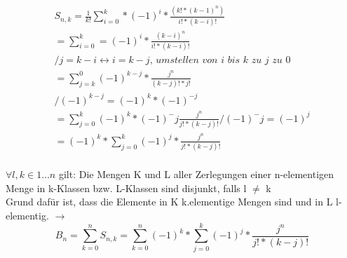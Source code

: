 \documentclass[]{article}
\title{}
\author{}
\date{}
\begin{document}
\maketitle





\begin{gather*}
 S_{n,k} = \frac{1}{k!} \sum_{i=0}^{k}*(-1)^i * \frac{(k!*(k-1)^n)}{i!*(k-i)!}\\
 = \sum_{i=0}^{k} = (-1)^i*\frac{(k-i)^n}{i!*(k-i)!}\\ / j = k-i \longleftrightarrow i=k-j \textit {, umstellen von i bis k zu j zu 0}\\
 =\sum_{j = k}^{0}(-1)^{k-j} * \frac{j^n}{(k-j)!*j!} \\ / (-1)^{k-j} = (-1)^k * (-1)^{-j}
 \\= \sum_{j=0}^{k} (-1)^k * (-1)^-j \frac{j^n}{j!*(k-j)!} / (-1)^-j = (-1)^j\\
 = (-1)^k * \sum_{j=0}^{k}(-1)^j * \frac{j^n}{j!*(k-j)!}\\
 \end{gather*}
 
$\forall l,k \in {1 \dots n}$ gilt: Die Mengen K und L aller Zerlegungen einer n-elementigen Menge in k-Klassen bzw. L-Klassen sind disjunkt, falls l  $\neq$ k  \\Grund dafür ist, dass die Elemente in K  k.elementige Mengen sind und in L l-elementig. 
$\rightarrow  $ \\
$$B_n = \sum_{k=0}^{n} S_{n,k} = \sum_{k=0}^{n}(-1)^k * \sum_{j=0}^{k} (-1)^j * \frac{j^n}{j! * (k-j)!} $$
\end{document}
